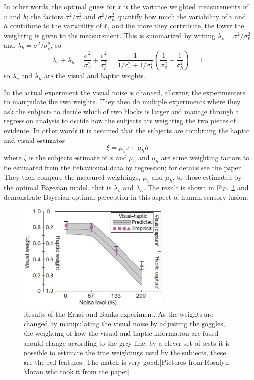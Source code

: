 \documentclass{article}
\begin{document}
In other words, the optimal guess for $x$ is the variance weighted
measurements of $v$ and $h$; the factors $\sigma^2/\sigma_v^2$ and
$\sigma^2/\sigma_h^2$ quantify how much the variability of $v$ and $h$
contribute to the variability of $\bar{x}$, and the more they
contribute, the lower the weighting is given to the measurement. This
is summarized by writing $\lambda_v=\sigma^2/\sigma_v^2$ and
$\lambda_h=\sigma^2/\sigma_h^2$, so
\begin{equation}
\lambda_v+\lambda_h=\frac{\sigma^2}{\sigma_v^2}+\frac{\sigma^2}{\sigma_h^2}=\frac{1}{1/\sigma_v^2+1/\sigma_h^2}\left(\frac{1}{\sigma_v^2}+\frac{1}{\sigma_h^2}\right)=1
\end{equation}
so $\lambda_v$ and $\lambda_h$ are the visual and haptic weights.

In the actual experiment the visual noise is changed, allowing the
experimenters to manipulate the two weights. They then do multiple
experiments where they ask the subjects to decide which of two blocks
is larger and manage through a regression analysis to decide how the
subjects are weighting the two pieces of evidence. In other words it is assumed that the subjects are combining the haptic and visual estimates
\begin{equation}
\xi=\mu_v v+\mu_h h
\end{equation}
where $\xi$ is the subjects estimate of $x$ and $\mu_v$ and $\mu_h$
are some weighting factors to be estimated from the behavioural data
by regression; for details see the paper. They then compare the
measured weightings, $\mu_v$ and $\mu_h$, to those estimated by the
optimal Bayesian model, that is $\lambda_v$ and $\lambda_h$. The
result is shown in Fig.~\ref{fig_weights} and demonstrate Bayesian
optimal perception in this aspect of human sensory fusion.


\begin{figure}[htb]
\begin{center}
\includegraphics[width=7.5cm]{fig_weights.png}
\end{center}
\caption{Results of the Ernst and Banks experiment. As the weights are
  changed by manipulating the visual noise by adjusting the goggles,
  the weighting of how the visual and haptic information are fused
  should change according to the grey line; by a clever set of tests
  it is possible to estimate the true weightings used by the subjects,
  these are the red features. The match is very good.[Pictures from
    Rosalyn Moran who took it from the paper]\label{fig_weights}}
\end{figure}


{}
\end{document}
